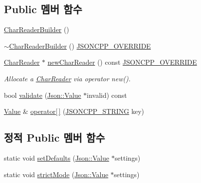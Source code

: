 \subsection*{Public 멤버 함수}
\begin{DoxyCompactItemize}
\item 
\hyperlink{class_json_1_1_char_reader_builder_a6e197b69a2ede3d87b03b9c5c78ba46a}{Char\+Reader\+Builder} ()
\item 
\hyperlink{class_json_1_1_char_reader_builder_ae8226503f5b947e9d618c39dd992c85c}{$\sim$\+Char\+Reader\+Builder} () \hyperlink{json_8h_a824d6199c91488107e443226fa6022c5}{J\+S\+O\+N\+C\+P\+P\+\_\+\+O\+V\+E\+R\+R\+I\+DE}
\item 
\hyperlink{class_json_1_1_char_reader}{Char\+Reader} $\ast$ \hyperlink{class_json_1_1_char_reader_builder_a3a262fcc76c1eb8eebfd4718fb4e9722}{new\+Char\+Reader} () const \hyperlink{json_8h_a824d6199c91488107e443226fa6022c5}{J\+S\+O\+N\+C\+P\+P\+\_\+\+O\+V\+E\+R\+R\+I\+DE}
\begin{DoxyCompactList}\small\item\em Allocate a \hyperlink{class_json_1_1_char_reader}{Char\+Reader} via operator new(). \end{DoxyCompactList}\item 
bool \hyperlink{class_json_1_1_char_reader_builder_af890b5cb70e9b372e41de5c9e6535d21}{validate} (\hyperlink{class_json_1_1_value}{Json\+::\+Value} $\ast$invalid) const
\item 
\hyperlink{class_json_1_1_value}{Value} \& \hyperlink{class_json_1_1_char_reader_builder_a84b35ef443340c06c0aa7b47851d8d86}{operator\mbox{[}$\,$\mbox{]}} (\hyperlink{json_8h_a1e723f95759de062585bc4a8fd3fa4be}{J\+S\+O\+N\+C\+P\+P\+\_\+\+S\+T\+R\+I\+NG} key)
\end{DoxyCompactItemize}
\subsection*{정적 Public 멤버 함수}
\begin{DoxyCompactItemize}
\item 
static void \hyperlink{class_json_1_1_char_reader_builder_a03ff031e06aabff989ab4addc87294ab}{set\+Defaults} (\hyperlink{class_json_1_1_value}{Json\+::\+Value} $\ast$settings)
\item 
static void \hyperlink{class_json_1_1_char_reader_builder_a9c19e3c5475f9072d527810d4bf56749}{strict\+Mode} (\hyperlink{class_json_1_1_value}{Json\+::\+Value} $\ast$settings)
\end{DoxyCompactItemize}
